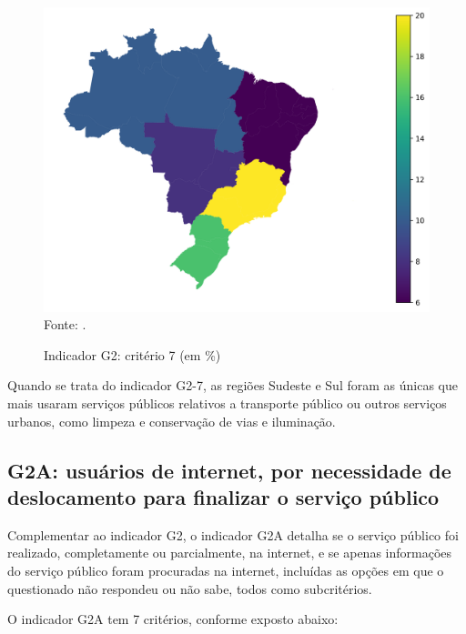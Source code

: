 \begin{figure}[H]
	\centering
	\caption{Indicador G2: critério 7 (em \%)}
	\includegraphics[width=1\linewidth]{figuras/mapa_coropletico_tic_domicilios_2024_g2_7.png}
	\label{fig:mapa_coropletico_tic_domicilios_2024_g2_7}
	\footnotesize{Fonte: \cite{tic_domicilios_2024_g2}.}
\end{figure}

Quando se trata do indicador G2-7, as regiões Sudeste e Sul foram as únicas que mais usaram serviços públicos relativos a transporte público ou outros serviços urbanos, como limpeza e conservação de vias e iluminação.

\subsection{G2A: usuários de internet, por necessidade de deslocamento para finalizar o serviço público}

Complementar ao indicador G2, o indicador G2A detalha se o serviço público foi realizado, completamente ou parcialmente, na internet, e se apenas informações do serviço público foram procuradas na internet, incluídas as opções em que o questionado não respondeu ou não sabe, todos como subcritérios. 

O indicador G2A tem 7 critérios, conforme exposto abaixo:

